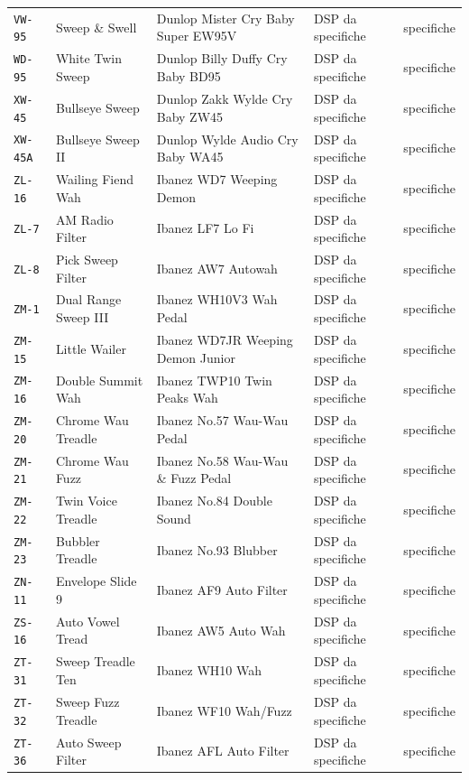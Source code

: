 \begin{xltabular}{\linewidth}{@{}l l X l l@{}}
\texttt{VW-95} & Sweep \& Swell & Dunlop Mister Cry Baby Super EW95V & DSP da specifiche & specifiche\\
\texttt{WD-95} & White Twin Sweep & Dunlop Billy Duffy Cry Baby BD95 & DSP da specifiche & specifiche\\
\texttt{XW-45} & Bullseye Sweep & Dunlop Zakk Wylde Cry Baby ZW45 & DSP da specifiche & specifiche\\
\texttt{XW-45A} & Bullseye Sweep II & Dunlop Wylde Audio Cry Baby WA45 & DSP da specifiche & specifiche\\
\texttt{ZL-16} & Wailing Fiend Wah & Ibanez WD7 Weeping Demon & DSP da specifiche & specifiche\\
\texttt{ZL-7} & AM Radio Filter & Ibanez LF7 Lo Fi & DSP da specifiche & specifiche\\
\texttt{ZL-8} & Pick Sweep Filter & Ibanez AW7 Autowah & DSP da specifiche & specifiche\\
\texttt{ZM-1} & Dual Range Sweep III & Ibanez WH10V3 Wah Pedal & DSP da specifiche & specifiche\\
\texttt{ZM-15} & Little Wailer & Ibanez WD7JR Weeping Demon Junior & DSP da specifiche & specifiche\\
\texttt{ZM-16} & Double Summit Wah & Ibanez TWP10 Twin Peaks Wah & DSP da specifiche & specifiche\\
\texttt{ZM-20} & Chrome Wau Treadle & Ibanez No.57 Wau-Wau Pedal & DSP da specifiche & specifiche\\
\texttt{ZM-21} & Chrome Wau Fuzz & Ibanez No.58 Wau-Wau \& Fuzz Pedal & DSP da specifiche & specifiche\\
\texttt{ZM-22} & Twin Voice Treadle & Ibanez No.84 Double Sound & DSP da specifiche & specifiche\\
\texttt{ZM-23} & Bubbler Treadle & Ibanez No.93 Blubber & DSP da specifiche & specifiche\\
\texttt{ZN-11} & Envelope Slide 9 & Ibanez AF9 Auto Filter & DSP da specifiche & specifiche\\
\texttt{ZS-16} & Auto Vowel Tread & Ibanez AW5 Auto Wah & DSP da specifiche & specifiche\\
\texttt{ZT-31} & Sweep Treadle Ten & Ibanez WH10 Wah & DSP da specifiche & specifiche\\
\texttt{ZT-32} & Sweep Fuzz Treadle & Ibanez WF10 Wah/Fuzz & DSP da specifiche & specifiche\\
\texttt{ZT-36} & Auto Sweep Filter & Ibanez AFL Auto Filter & DSP da specifiche & specifiche\\

\end{xltabular}
